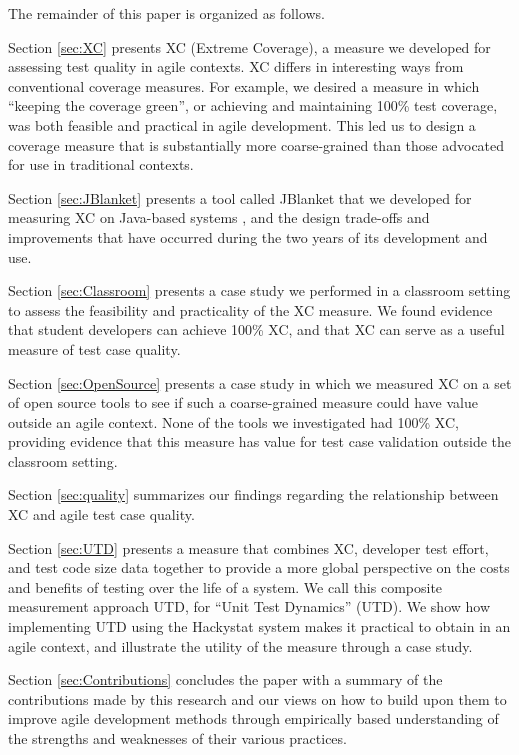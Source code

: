 \documentclass[10pt,twocolumn]{article}
\begin{document}
The remainder of this paper is organized as follows.

Section \ref{sec:XC} presents XC (Extreme Coverage), a measure
we developed for assessing test quality in agile contexts.  XC
differs in interesting ways from conventional coverage measures. For
example, we desired a measure in which ``keeping the coverage green'', or
achieving and maintaining 100\% test coverage, was both feasible and
practical in agile development. This led us to design a coverage measure
that is substantially more coarse-grained than those advocated for use in
traditional contexts.

Section \ref{sec:JBlanket} presents a tool called JBlanket 
that we developed for measuring XC on Java-based systems
\cite{csdl2-02-06}, and the design trade-offs and improvements that have
occurred during the two years of its development and use. 

Section \ref{sec:Classroom} presents a case study we performed in a classroom
setting to assess the feasibility and practicality of the XC measure. We 
found evidence that student developers can achieve 100\% XC, and that XC
can serve as a useful measure of test case quality.

Section \ref{sec:OpenSource} presents a case study in which we measured XC on
a set of open source tools to see if such a coarse-grained measure could
have value outside an agile context.  None of the tools we investigated
had 100\% XC, providing evidence that this measure has value for test case
validation outside the classroom setting.

Section \ref{sec:quality} summarizes our findings regarding the
relationship between XC and agile test case quality.

Section \ref{sec:UTD} presents a measure that combines XC, developer test effort, and
test code size data together to provide a more global perspective on the costs
and benefits of testing over the life of a system. We call this composite
measurement approach UTD, for  ``Unit Test Dynamics'' (UTD). We show how
implementing UTD using the Hackystat system \cite{csdl2-02-07} makes it
practical to obtain in an agile context, and illustrate the utility of the
measure through a case study.

Section \ref{sec:Contributions} concludes the paper with a summary of the
contributions made by this research and our views on how to build upon them 
to improve agile development methods through empirically based
understanding of the strengths and weaknesses of their various practices.
\end{document}
